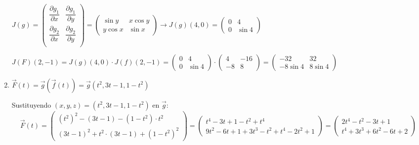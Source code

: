 \begin{enumerate}[label=\c olor{red}\textbf{\arabic*)}, leftmargin=*]
$J(g)=\begin{pmatrix}
\dfrac{\partial g_1}{\partial x} & \dfrac{\partial g_1}{\partial y}\\
\dfrac{\partial g_2}{\partial x} & \dfrac{\partial g_2}{\partial y}\\
\end{pmatrix}=\begin{pmatrix}
\sin y & x\cos y\\
y\cos x & \sin x
\end{pmatrix}\longrightarrow J(g)(4,0)=\begin{pmatrix}
0 & 4\\
0 & \sin 4
\end{pmatrix}$

$J(F)(2,-1)=J(g)(4,0)\cdot J(f)(2,-1)=\begin{pmatrix}
0 & 4\\
0 & \sin 4
\end{pmatrix}\cdot\begin{pmatrix}
4 & -16\\
-8 & 8
\end{pmatrix}=\begin{pmatrix}
-32 & 32\\
-8\sin 4 & 8\sin4
\end{pmatrix}$

\item {}

$\vec{F}(t)=\vec{g}(\vec{f}(t))=\vec{g}(t^2, 3t-1,1-t^2)$

Sustituyendo $(x,y,z)=(t^2, 3t-1,1-t^2)$ en $\vec{g}$: \[ \vec{F}(t)=\begin{pmatrix}
(t^2)^2-(3t-1)-(1-t^2)\cdot t^2\\
(3t-1)^2+t^2\cdot(3t-1)+(1-t^2)^2
\end{pmatrix}=\begin{pmatrix}
t^4-3t+1-t^2+t^4\\
9t^2-6t+1+3t^3-t^2+t^4-2t^2+1
\end{pmatrix}=\begin{pmatrix}
2t^4-t^2-3t+1\\
t^4+3t^3+6t^2-6t+2
\end{pmatrix} \]


\end{enumerate}
